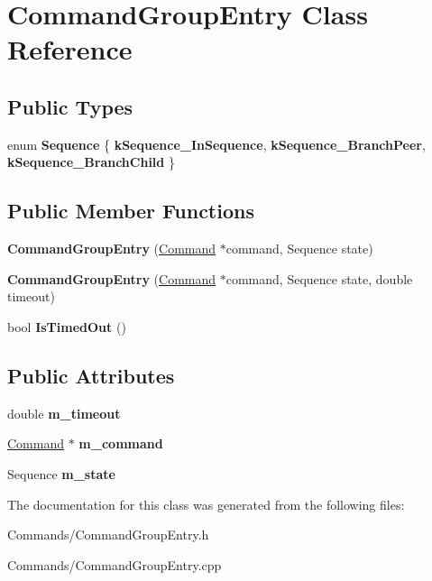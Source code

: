 \hypertarget{classCommandGroupEntry}{
\section{CommandGroupEntry Class Reference}
\label{classCommandGroupEntry}
}
\subsection*{Public Types}
\begin{DoxyCompactItemize}
\item 
enum {\bfseries Sequence} \{ {\bfseries kSequence\_\-InSequence}, 
{\bfseries kSequence\_\-BranchPeer}, 
{\bfseries kSequence\_\-BranchChild}
 \}
\end{DoxyCompactItemize}
\subsection*{Public Member Functions}
\begin{DoxyCompactItemize}
\item 
\hypertarget{classCommandGroupEntry_a638a9b82f73e4aa5b268eaad4a1c95de}{
{\bfseries CommandGroupEntry} (\hyperlink{classCommand}{Command} $\ast$command, Sequence state)}
\label{classCommandGroupEntry_a638a9b82f73e4aa5b268eaad4a1c95de}

\item 
\hypertarget{classCommandGroupEntry_abfaf3a0c26540aaddb9c03f348415c75}{
{\bfseries CommandGroupEntry} (\hyperlink{classCommand}{Command} $\ast$command, Sequence state, double timeout)}
\label{classCommandGroupEntry_abfaf3a0c26540aaddb9c03f348415c75}

\item 
\hypertarget{classCommandGroupEntry_a032cbffc15b0b82cbd25a7effe653933}{
bool {\bfseries IsTimedOut} ()}
\label{classCommandGroupEntry_a032cbffc15b0b82cbd25a7effe653933}

\end{DoxyCompactItemize}
\subsection*{Public Attributes}
\begin{DoxyCompactItemize}
\item 
\hypertarget{classCommandGroupEntry_af1d630c1c64a8614cd3d1dce6f87cc31}{
double {\bfseries m\_\-timeout}}
\label{classCommandGroupEntry_af1d630c1c64a8614cd3d1dce6f87cc31}

\item 
\hypertarget{classCommandGroupEntry_ab26677062ebee008ec137472bad3da7d}{
\hyperlink{classCommand}{Command} $\ast$ {\bfseries m\_\-command}}
\label{classCommandGroupEntry_ab26677062ebee008ec137472bad3da7d}

\item 
\hypertarget{classCommandGroupEntry_a3366b587d3828a04ad4f7d0c825590b9}{
Sequence {\bfseries m\_\-state}}
\label{classCommandGroupEntry_a3366b587d3828a04ad4f7d0c825590b9}

\end{DoxyCompactItemize}


The documentation for this class was generated from the following files:\begin{DoxyCompactItemize}
\item 
Commands/CommandGroupEntry.h\item 
Commands/CommandGroupEntry.cpp\end{DoxyCompactItemize}
